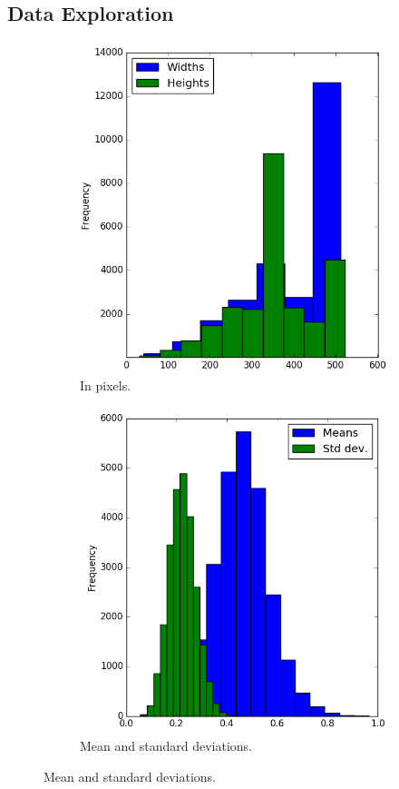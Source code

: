 \documentclass[11pt]{article}
\begin{document}
\subsection{Data Exploration}
\begin{figure}
    \centering
    \caption{Histograms of image sizes and luminances}
    \label{fig:analysis}
    \begin{subfigure}{.5\textwidth}
  	    \caption{In pixels.}
  	    \label{fig:imagesizes}
        \includegraphics[width=\textwidth]{images/image_sizes}
    \end{subfigure}%
    \begin{subfigure}{.515\textwidth}
    	\caption{Mean and standard deviations.}
    	\label{fig:luminance}
    	\includegraphics[width=\textwidth]{images/luminance}

\end{subfigure}
\end{figure}
\end{document}
